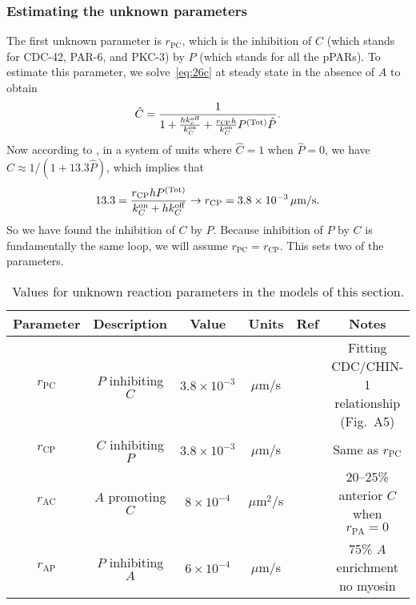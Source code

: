 \documentclass[11pt]{article}
\newcommand{\6}[1]{#1_{\text{6}}}
\newcommand{\3}[1]{#1_{\text{3}}}
\newcommand{\Tot}[1]{#1^\text{(Tot)}}
\begin{document}
\subsubsection{Estimating the unknown parameters}
The first unknown parameter is $r_\text{PC}$, which is the inhibition of $C$ (which stands for CDC-42, PAR-6, and PKC-3) by $P$ (which stands for all the pPARs). To estimate this parameter, we solve\ \eqref{eq:26c} at steady state in the absence of $A$ to obtain
\begin{equation}
\hat C = \frac{1}{1+\frac{h \koff_c}{\kon_C}+\frac{r_\text{CP}h}{\kon_C} \Tot{P} \hat P}. 
\end{equation}
Now according to \cite{sailer2015dynamic}, in a system of units where $\hat C=1$ when $\hat P=0$, we have $\hat{C} \approx 1/(1+13.3\hat{P})$, which implies that 
\begin{equation*}
13.3 = \frac{r_\text{CP} h \Tot{P}}{\kon_C+h\koff_C}\rightarrow r_\text{CP}=3.8 \times 10^{-3} \, \mu \text{m/s}.
\end{equation*}
So we have found the inhibition of $C$ by $P$. Because inhibition of $P$ by $C$ is fundamentally the same loop, we will assume $r_\text{PC}=r_\text{CP}$. This sets two of the parameters.

\begin{table}
\begin{small}
\centering
\begin{tabular}{|c|c|c|c|c|c|}\hline
Parameter & Description & Value & Units & Ref & Notes \\ \hline
$r_\text{PC}$ & $P$ inhibiting $C$ & $3.8 \times 10^{-3}$  & $\mu$m/s & \cite{sailer2015dynamic} & Fitting CDC/CHIN-1 relationship (Fig.\ A5)\\ 
$r_\text{CP}$ & $C$ inhibiting $P$ & $3.8 \times 10^{-3}$  & $\mu$m/s & \cite{sailer2015dynamic} & Same as $r_\text{PC}$ \\
$r_\text{AC}$ & $A$ promoting $C$ & $8 \times 10^{-4}$ & $\mu$m$^2$/s & \cite{sailer2015dynamic} & 20--25\% anterior $C$ when $r_\text{PA}=0$ \\
$r_\text{AP}$ & $P$ inhibiting $A$ & $6 \times 10^{-4}$ & $\mu$m/s & \cite{zonies2010symmetry} & 75\% $A$ enrichment no myosin \\ \hline
\end{tabular}
\caption{\label{tab:params3} Values for unknown reaction parameters in the models of this section.}
\end{small}
\end{table}
\end{document}
